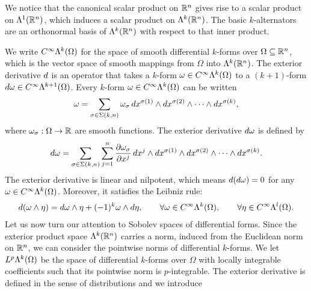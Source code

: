 \documentclass[10pt,letterpaper]{article}
\begin{document}
We notice that the canonical scalar product on ${\mathbb R}^{n}$ gives rise to a scalar product on $\Lambda^{1}({\mathbb R}^{n})$,
which induces a scalar product on $\Lambda^{k}({\mathbb R}^{n})$.
The basic $k$-alternators are an orthonormal basis of $\Lambda^{k}({\mathbb R}^{n})$ with respect to that inner product. 

We write $C^{\infty}\Lambda^{k}(\Omega)$ for the space of smooth differential $k$-forms over $\Omega \subseteq {\mathbb R}^{n}$,
which is the vector space of smooth mappings from $\Omega$ into $\Lambda^{k}({\mathbb R}^{n})$.
The exterior derivative \( d \) is an operator that takes a \( k \)-form \( \omega \in C^{\infty}\Lambda^{k}(\Omega) \) 
to a \((k+1)\)-form \( d\omega \in C^{\infty}\Lambda^{k+1}(\Omega) \). 
Every \( k \)-form \( \omega \in C^{\infty}\Lambda^{k}(\Omega) \) can be written 
\begin{gather*}
    \omega = 
    \sum_{ \sigma \in \Sigma(k,n) } 
    \omega_{\sigma} \, 
    dx^{\sigma(1)} \wedge dx^{\sigma(2)} \wedge \cdots \wedge dx^{\sigma(k)},
\end{gather*}
where \( \omega_{\sigma} : \Omega \rightarrow {\mathbb R} \) are smooth functions.
The exterior derivative \( d\omega \) is defined by
\begin{gather*}
    d\omega = 
    \sum_{ \sigma \in \Sigma(k,n) } 
    \sum_{j=1}^{n} 
    \frac{\partial \omega_{\sigma}}{\partial x^j} 
    \, dx^j \wedge 
    dx^{\sigma(1)} \wedge dx^{\sigma(2)} \wedge \cdots \wedge dx^{\sigma(k)}.
\end{gather*}
The exterior derivative is linear and nilpotent, which means 
\( d(d\omega) = 0 \) for any \( \omega \in C^{\infty}\Lambda^{k}(\Omega) \).
Moreover, it satisfies the Leibniz rule:
\begin{gather*} 
    d(\omega \wedge \eta) 
    = 
    d\omega \wedge \eta + (-1)^{k} \omega \wedge d\eta, 
    \qquad \forall \omega \in C^{\infty}\Lambda^{k}(\Omega), 
    \qquad \forall \eta \in C^{\infty}\Lambda^{l}(\Omega).
\end{gather*}
Let us now turn our attention to Sobolev spaces of differential forms. 
Since the exterior product space $\Lambda^{k}({\mathbb R}^{n})$ carries a norm, induced from the Euclidean norm on ${\mathbb R}^{n}$, we can consider the pointwise norms of differential $k$-forms. 
We let $L^{p}\Lambda^{k}(\Omega)$ be the space of differential $k$-forms over $\Omega$ with locally integrable coefficients 
such that its pointwise norm is $p$-integrable. 
The exterior derivative is defined in the sense of distributions and we introduce 
\end{document}
